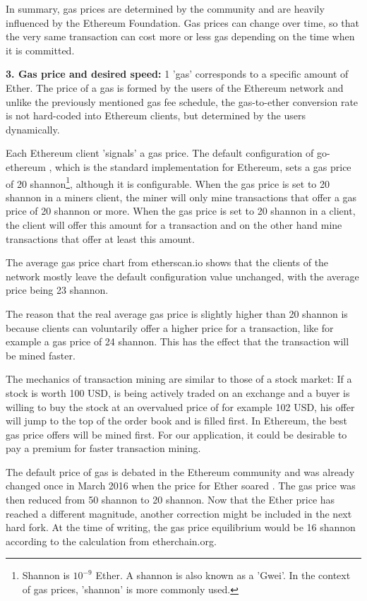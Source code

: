 In summary, gas prices are determined by the community and are heavily influenced by the Ethereum Foundation. Gas prices can change over time, so that the very same transaction can cost more or less gas depending on the time when it is committed.

\par
\textbf{3. Gas price and desired speed:} 1 'gas' corresponds to a specific amount of Ether. The price of a gas is formed by the users of the Ethereum network and unlike the previously mentioned gas fee schedule, the gas-to-ether conversion rate is not hard-coded into Ethereum clients, but determined by the users dynamically.

Each Ethereum client 'signals' a gas price. The default configuration of go-ethereum \cite{DefaultGoEthereumConfiguration}, which is the standard implementation for Ethereum, sets a gas price of 20 shannon\footnote{ Shannon is $10^{-9}$ Ether. A shannon is also known as a 'Gwei'. In the context of gas prices, 'shannon' is more commonly used.}, although it is configurable. When the gas price is set to 20 shannon in a miners client, the miner will only mine transactions that offer a gas price of 20 shannon or more. When the gas price is set to 20 shannon in a client, the client will offer this amount for a transaction and on the other hand mine transactions that offer at least this amount.

The average gas price chart from etherscan.io \cite{AverageGasPrice} shows that the clients of the network mostly leave the default configuration value unchanged, with the average price being 23 shannon.

The reason that the real average gas price is slightly higher than 20 shannon is because clients can voluntarily offer a higher price for a transaction, like for example a gas price of 24 shannon. This has the effect that the transaction will be mined faster.

The mechanics of transaction mining are similar to those of a stock market: If a stock is worth 100 USD, is being actively traded on an exchange and a buyer is willing to buy the stock at an overvalued price of for example 102 USD, his offer will jump to the top of the order book and is filled first. In Ethereum, the best gas price offers will be mined first. For our application, it could be desirable to pay a premium for faster transaction mining.

The default price of gas is debated in the Ethereum community and was already changed once in March 2016 when the price for Ether soared \cite{AverageGasPrice}. The gas price was then reduced from 50 shannon to 20 shannon. Now that the Ether price has reached a different magnitude, another correction might be included in the next hard fork. At the time of writing, the gas price equilibrium would be 16 shannon according to the calculation from etherchain.org.

